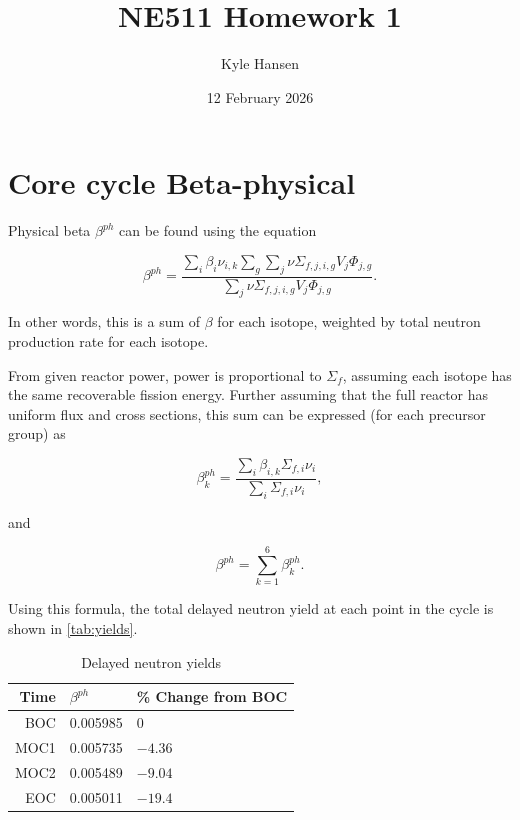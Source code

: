 \documentclass{hw-template}
\title{NE511 Homework 1}
\author{Kyle Hansen}
\date{12 February 2026}
\begin{document}
\maketitle{}

\section{Core cycle Beta-physical}

Physical beta $\beta^{ph}$ can be found using the equation

\begin{equation}
    \beta^{ph} = \frac{\sum_i \beta_i \nu_{i, k} \sum_g \sum_j \nu \Sigma_{f, j, i, g}V_j \Phi_{j, g}}     {\sum_j \nu \Sigma_{f, j, i, g}V_j \Phi_{j, g}}.
\end{equation}

In other words, this is a sum of $\beta$ for each isotope, weighted by total neutron production rate for each isotope. 

From given reactor power, power is proportional to $\Sigma_f$, assuming each isotope has the same recoverable fission energy. Further assuming that the full reactor has uniform flux and cross sections, this sum can be expressed (for each precursor group) as

\begin{equation}
    \beta^{ph}_k = \frac{\sum_i \beta_{i,k} \Sigma_{f, i}\nu_{i}}  {\sum_i \Sigma_{f, i}\nu_{i}},
\end{equation}

and 

\begin{equation}
    \beta^{ph} = \sum_{k=1}^{6}\beta^{ph}_k.
\end{equation}

Using this formula, the total delayed neutron yield at each point in the cycle is shown in \autoref{tab:yields}.



\begin{table}
    \centering
    \caption{Delayed neutron yields}\label{tab:yields}
    \begin{tabular}{r|l|l}
        \hline
        Time & $\beta^{ph}$ & \% Change from BOC \\
        \hline\hline
        BOC  &   0.005985   &  0\\
        MOC1 &   0.005735   & $-4.36$\\
        MOC2 &   0.005489   & $-9.04$\\
        EOC  &   0.005011    & $-19.4$
    \end{tabular}
\end{table}
\end{document}
